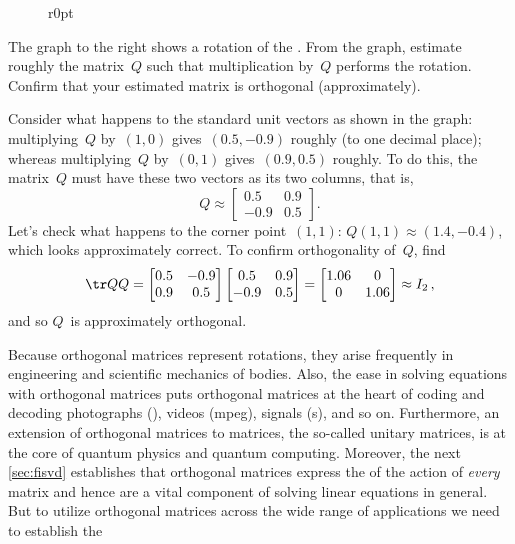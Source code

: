 \begin{wrapfigure}r{0pt}
\def\unithousesize{footnotesize,grid} 
\end{wrapfigure}
\begin{example} \label{eg:introt}
The graph to the right shows a rotation of the . 
From the graph, estimate roughly the matrix~\(Q\) such that multiplication by~\(Q\) performs the rotation. 
Confirm that your estimated matrix is orthogonal (approximately).

\begin{solution} 
Consider what happens to the standard unit vectors as shown in the graph:  multiplying~\(Q\) by~\((1,0)\) gives~\((0.5,-0.9)\) roughly (to one decimal place); whereas multiplying~\(Q\) by~\((0,1)\) gives~\((0.9,0.5)\) roughly.
To do this, the matrix~\(Q\) must have these two vectors as its two columns, that is,
\begin{equation*}
Q\approx\begin{bmatrix} 0.5&0.9\\-0.9&0.5 \end{bmatrix}.
\end{equation*}
Let's check what happens to the corner point~\((1,1)\): \(Q(1,1)\approx (1.4,-0.4)\), which looks approximately correct.
To confirm orthogonality of~\(Q\), find
\begin{equation*}
\tr QQ=\begin{bmatrix} 0.5&-0.9\\0.9&0.5 \end{bmatrix}
\begin{bmatrix} 0.5&0.9\\-0.9&0.5 \end{bmatrix}
=\begin{bmatrix} 1.06&0\\0&1.06 \end{bmatrix}\approx I_2\,,
\end{equation*}
and so \(Q\)~is approximately orthogonal.
\end{solution}
\end{example}


Because orthogonal matrices represent rotations, they arise frequently in engineering and scientific mechanics of bodies.
Also, the ease in solving equations with orthogonal matrices puts orthogonal matrices at the heart of coding and decoding photographs (), videos (mpeg), signals (s), and so on.
Furthermore, an extension of orthogonal matrices to  matrices, the so-called unitary matrices, is at the core of quantum physics and quantum computing.
Moreover, the next \cref{sec:fisvd} establishes that orthogonal matrices express the  of the action of \emph{every} matrix and hence are a vital component of solving linear equations in general.
But to utilize orthogonal matrices across the wide range of applications we need to establish the 




